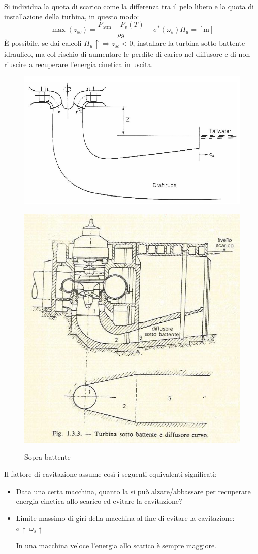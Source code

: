 \documentclass[a4paper, 15pt]{article}
\begin{document}
\begin{adjustwidth}{2in}{}
	Si individua la quota di scarico come la differenza tra il pelo libero e la quota di installazione della turbina, in questo modo:
	\[\max(z_{sc}) = \dfrac{P_{\text{atm}} - P_v(T)}{\rho g} - \sigma^*(\omega_s) H_u = [\text{m}]\]
	È possibile, se dai calcoli $H_u\uparrow\Rightarrow z_{sc}<0$, installare la turbina sotto battente idraulico, ma col rischio di aumentare le perdite di carico nel diffusore e di non riuscire a recuperare l'energia cinetica in uscita.
	\begin{figure}[H]
		\centering
		\includegraphics[width=0.3\linewidth]{immagini/turbinafrancis5}
		\caption{Sopra battente}
		\includegraphics[width=0.3\linewidth]{immagini/turbinafrancis6}	
		\label{fig:turbinafrancis5}
		\label{fig:turbinafrancis6}
	\end{figure}
	Il fattore di cavitazione assume così i seguenti equivalenti significati:
	\begin{itemize}
		\item Data una certa macchina, quanto la si può alzare/abbassare per recuperare energia cinetica allo scarico ed evitare la cavitazione?
		\item Limite massimo di giri della macchina al fine di evitare la cavitazione: $\sigma\uparrow~\omega_s\uparrow$
		
		In una macchina veloce l'energia allo scarico è sempre maggiore.		
	\end{itemize}	
\end{adjustwidth}		


\newpage
\end{document}

